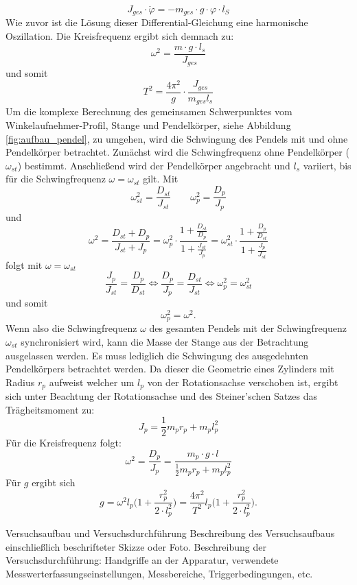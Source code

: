 \[
J_{ges} \cdot \ddot{\varphi} = -m_{ges } \cdot g \cdot \varphi \cdot l_{S} 
\]
Wie zuvor ist die Lösung dieser Differential-Gleichung eine harmonische Oszillation. Die Kreisfrequenz ergibt sich demnach zu:
\[
\omega^2 = \frac{m\cdot g\cdot l_s}{J_{ges}}
\]
und somit
\[
T^2 = \frac{4\pi^2}{g}\cdot \frac{J_{ges}}{m_{ges}l_s}
\]
Um die komplexe Berechnung des gemeinsamen Schwerpunktes vom Winkelaufnehmer-Profil, Stange und Pendelkörper, siehe Abbildung \ref{fig:aufbau_pendel}, zu umgehen, wird die Schwingung des Pendels mit und ohne Pendelkörper betrachtet. Zunächst wird die Schwingfrequenz ohne Pendelkörper ($\omega_{st}$) bestimmt. Anschließend wird der Pendelkörper angebracht und $l_s$ variiert, bis für die Schwingfrequenz $\omega = \omega_{st}$ gilt. Mit
\[
\omega_{st}^2 = \frac{D_{st}}{J_{st}} \quad \quad \omega_{p}^2 = \frac{D_{p}}{J_{p}}
\]
und
\[
\omega^2 = \frac{D_{st}+D_p}{J_{st}+J_p} = \omega_{p}^2 \cdot \frac{1+\frac{D_{st}}{D_p}}{1+\frac{J_{st}}{J_p}} = \omega_{st}^2 \cdot \frac{1+\frac{D_p}{D_{st}}}{1+\frac{J_p}{J_{st}}}
\]
folgt mit $\omega = \omega_{st}$
\[
\frac{J_p}{J_{st}} = \frac{D_p}{D_{st}} \Leftrightarrow \frac{D_p}{J_p} = \frac{D_{st}}{J_{st}} \Leftrightarrow \omega_{p}^2 = \omega_{st}^2
\]
und somit
\[
\omega_{p}^2 = \omega^2.
\]
Wenn also die Schwingfrequenz $\omega$ des gesamten Pendels mit der Schwingfrequenz $\omega_{st}$ synchronisiert wird, kann die Masse der Stange aus der Betrachtung ausgelassen werden. Es muss lediglich die Schwingung des ausgedehnten Pendelkörpers betrachtet werden. Da dieser die Geometrie eines Zylinders mit Radius $r_p$ aufweist welcher um $l_p$ von der Rotationsachse verschoben ist, ergibt sich unter Beachtung der Rotationsachse und des Steiner'schen Satzes das Trägheitsmoment zu:
\[
J_p = \frac{1}{2} m_p r_p + m_p l_p^2
\]
Für die Kreisfrequenz folgt:
\[
\omega^2 = \frac{D_p}{J_p} = \frac{m_p\cdot g \cdot l}{\frac{1}{2} m_p r_p + m_p l_p^2}
\]
Für $g$ ergibt sich
\begin{equation}
g = \omega^2 l_p \Bigg(1+\frac{r_p^2}{2\cdot l_p^2}\Bigg) = \frac{4 \pi^2}{T^2} l_p \Bigg(1+\frac{r_p^2}{2\cdot l_p^2}\Bigg).
\end{equation}


 
\begin{aufgabe}{Versuchsaufbau und Versuchsdurchführung}
	Beschreibung des Versuchsaufbaus einschließlich beschrifteter Skizze
	oder Foto. Beschreibung der Versuchsdurchführung: Handgriffe an der
	Apparatur, verwendete Messwerterfassungseinstellungen, Messbereiche,
	Triggerbedingungen, etc.
\end{aufgabe}

